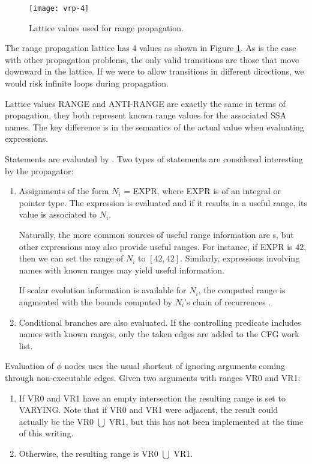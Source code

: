 \begin{figure}
    \centering
    \parbox{2in}{\texttt{[image: vrp-4]}}
    \caption{Lattice values used for range propagation.}
    \label{novillo:fig:vrp-lattice}
\end{figure}

The range propagation lattice has 4 values as shown in Figure
\ref{novillo:fig:vrp-lattice}.  As is the case with other
propagation problems, the only valid transitions are those that
move downward in the lattice.  If we were to allow transitions in
different directions, we would risk infinite loops during
propagation.

Lattice values \textsc{RANGE} and \textsc{ANTI-RANGE} are exactly
the same in terms of propagation, they both represent known
range values for the associated SSA names.  The key difference is
in the semantics of the actual value when evaluating expressions.

Statements are evaluated by .  Two types of
statements are considered interesting by the propagator:

\begin{enumerate}
\item	Assignments of the form $N_i$ = EXPR, where EXPR is of
	an integral or pointer type.  The expression is evaluated
	and if it results in a useful range, its value is
	associated to $N_i$.
	
	Naturally, the more common sources of useful range
	information are s, but other
	expressions may also provide useful ranges.  For
	instance, if EXPR is $42$, then we can set the range of
	$N_i$ to $[42, 42]$.  Similarly, expressions involving
	names with known ranges may yield useful information.

	If scalar evolution information is available for $N_i$,
	the computed range is augmented with the bounds computed
	by $N_i$'s chain of recurrences
	\cite{novillo:bib:berlin.ea-04}.

\item	Conditional branches are also evaluated.  If the
	controlling predicate includes names with known ranges,
	only the taken edges are added to the CFG work list.
\end{enumerate}

Evaluation of $\phi$ nodes uses the usual shortcut of ignoring
arguments coming through non-executable edges.  Given two
arguments with ranges VR0 and VR1:

\begin{enumerate}
\item	If VR0 and VR1 have an empty intersection the resulting
	range is set to VARYING.  Note that if VR0 and VR1
	were adjacent, the result could actually be the VR0
	$\bigcup$ VR1, but this has not been implemented at the
	time of this writing.

\item	Otherwise, the resulting range is VR0 $\bigcup$ VR1.
\end{enumerate}

